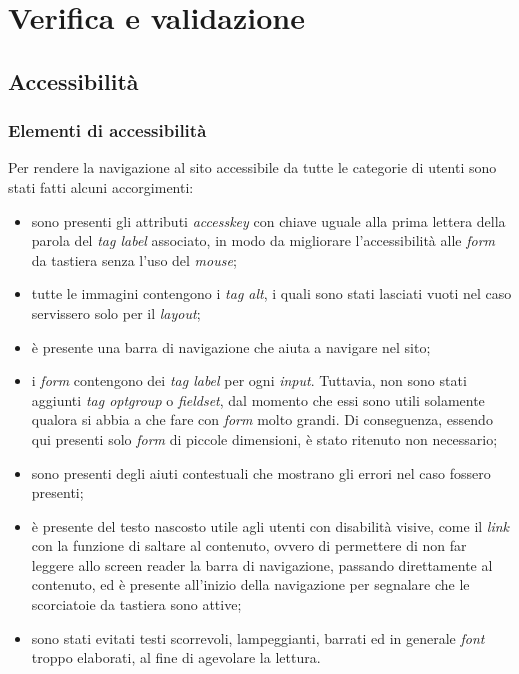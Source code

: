 
\chapter{Verifica e validazione}
\label{cap:verifica-validazione}

\section{Accessibilità}
\subsection{Elementi di accessibilità}
Per rendere la navigazione al sito accessibile da tutte le categorie di utenti
sono stati fatti alcuni accorgimenti:
\begin{itemize}
      \item sono presenti gli attributi \textit{accesskey} con chiave uguale
            alla
            prima lettera della parola del \textit{tag label} associato, in
            modo
            da
            migliorare l'accessibilità alle \textit{form} da tastiera senza
            l'uso
            del
            \textit{mouse};
      \item tutte le immagini contengono i \textit{tag alt}, i quali sono stati
            lasciati vuoti nel caso servissero solo per il \textit{layout};
      \item è presente una barra di navigazione che aiuta a navigare nel sito;
      \item i \textit{form} contengono dei \textit{tag label} per ogni
            \textit{input}. Tuttavia, non sono stati aggiunti \textit{tag
                  optgroup} o
            \textit{fieldset}, dal momento che essi sono utili solamente
            qualora si abbia a che fare con \textit{form}
            molto grandi.
            Di conseguenza, essendo qui presenti solo  \textit{form} di piccole
            dimensioni, è stato ritenuto non necessario;
      \item sono presenti degli aiuti contestuali che mostrano gli errori nel
            caso fossero presenti;
      \item è presente del testo nascosto utile agli utenti con disabilità
            visive, come il \textit{link} con la funzione  di saltare al
            contenuto, ovvero
            di permettere di non far leggere allo \gls{screen reader} la barra
            di
            navigazione, passando direttamente al contenuto, ed è presente
            all'inizio della
            navigazione per segnalare che le scorciatoie da tastiera sono
            attive;
      \item sono stati evitati testi scorrevoli, lampeggianti, barrati ed in
            generale \textit{font} troppo elaborati, al fine di agevolare la
            lettura.
\end{itemize}

